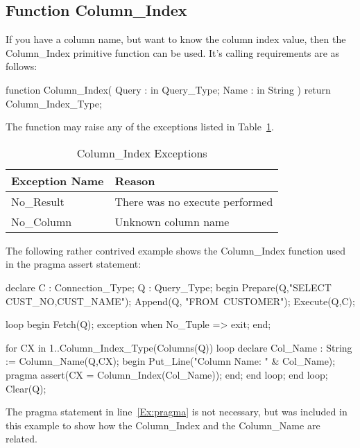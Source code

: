 \documentclass[english,letterpaper]{book}
\begin{document}
\subsection{Function Column\_Index}

If you have a column name, but want to know the column index value,
then the Column\_Index primitive function can be used. It's calling
requirements are as follows:

\begin{Code}
function Column_Index(
   Query : in Query_Type;
   Name :  in String
) return Column_Index_Type;
\end{Code}

The function may raise any of the exceptions listed in Table~\ref{t:cidxx}.

\begin{table}
   \begin{center}
      \begin{tabular}{ll}
         Exception Name    &  Reason\\
         \hline 
         No\_Result        &  There was no execute performed\\
         No\_Column        &  Unknown column name\\
      \end{tabular}
   \end{center}
   \caption{Column\_Index Exceptions}\label{t:cidxx}
\end{table}

The following rather contrived example shows the Column\_Index function
used in the pragma assert statement:

\begin{NumberedExample}
declare
   C : Connection_Type;
   Q : Query_Type;
begin
   Prepare(Q,"SELECT CUST_NO,CUST_NAME");
   Append(Q, "FROM~CUSTOMER");
   Execute(Q,C);

   loop
      begin
         Fetch(Q);
      exception
         when No_Tuple =>
            exit;
      end;

      for CX in 1..Column_Index_Type(Columns(Q)) loop
         declare
            Col_Name : String := Column_Name(Q,CX);
         begin
            Put_Line("Column Name: " & Col_Name);
            pragma assert(CX = Column_Index(Col_Name));\label{Ex:pragma}
         end;
      end loop;
   end loop;
   Clear(Q);
\end{NumberedExample}

The pragma statement in line~\ref{Ex:pragma} is not necessary, but 
was included in this example to show how the Column\_Index and the
Column\_Name are related.
\end{document}
